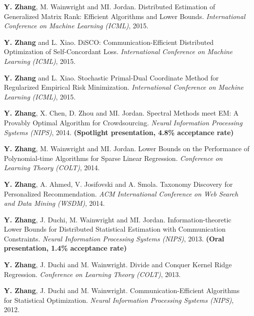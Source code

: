 \documentclass{res}
\begin{document}
\begin{resume}
\begin{enumerate}[label={[C\arabic*]}, ref={C\arabic*}]
\item \textbf{Y. Zhang}, M. Wainwright and MI. Jordan. Distributed Estimation of Generalized Matrix Rank: Efficient Algorithms and Lower Bounds.
\emph{International Conference on Machine Learning (ICML)}, 2015. \label{distributed-icml15}

\item \textbf{Y. Zhang} and L. Xiao. DiSCO: Communication-Efficient Distributed Optimization of Self-Concordant Loss.
\emph{International Conference on Machine Learning (ICML)}, 2015. \label{communication-icml15}

\item \textbf{Y. Zhang} and L. Xiao. Stochastic Primal-Dual Coordinate Method for Regularized Empirical Risk Minimization.
\emph{International Conference on Machine Learning (ICML)}, 2015.\label{stochastic-icml15}

\item \textbf{Y. Zhang}, X. Chen, D. Zhou and MI. Jordan. Spectral Methods meet EM: A Provably Optimal Algorithm for Crowdsourcing.
\emph{Neural Information Processing Systems (NIPS)}, 2014. \textbf{(Spotlight presentation, 4.8\% acceptance rate)}
\label{spectral-nips14}

\item \textbf{Y. Zhang}, M. Wainwright and MI. Jordan. Lower Bounds on the Performance of Polynomial-time Algorithms for Sparse Linear Regression. \emph{Conference on Learning Theory (COLT)}, 2014. \label{lower-colt14}

\item \textbf{Y. Zhang}, A. Ahmed, V. Josifovski and A. Smola. Taxonomy Discovery for Personalized Recommendation. \emph{ACM International Conference on Web Search and Data Mining (WSDM)}, 2014. \label{taxonomy-wsdm14}

\item \textbf{Y. Zhang}, J. Duchi, M. Wainwright and MI. Jordan. Information-theoretic Lower Bounds for Distributed Statistical Estimation with Communication Constraints.
\emph{Neural Information Processing Systems (NIPS)}, 2013. \textbf{(Oral presentation, 1.4\% acceptance rate)}
\label{information-nips13}

\item  \textbf{Y. Zhang}, J. Duchi and M. Wainwright. Divide and Conquer Kernel Ridge Regression.
\emph{Conference on Learning Theory (COLT)}, 2013. \label{divide-colt13}

\item  \textbf{Y. Zhang}, J. Duchi and M. Wainwright. Communication-Efficient Algorithms for Statistical Optimization.
\emph{Neural Information Processing Systems (NIPS)}, 2012. \label{communication-nips12}


\end{enumerate}
\end{resume}
\end{document}
